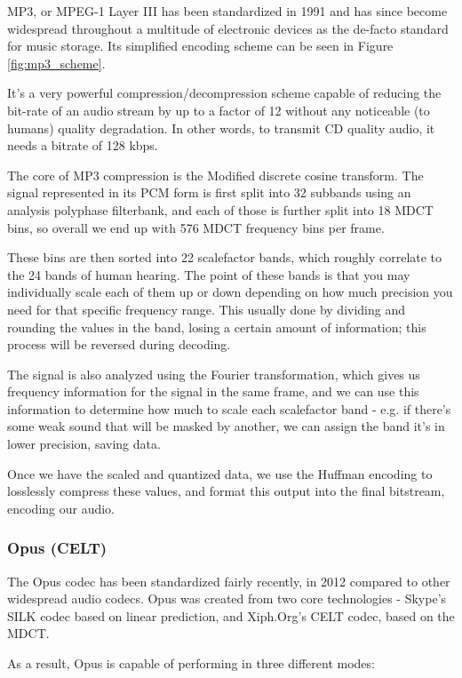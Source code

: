 MP3, or MPEG-1 Layer III has been standardized in 1991 and has since become widespread throughout a multitude of electronic devices as the de-facto standard for music storage. Its simplified encoding scheme can be seen in Figure \ref{fig:mp3_scheme}.

It's a very powerful compression/decompression scheme capable of reducing the bit-rate of an audio stream by up to a factor of 12 without any noticeable (to humans) quality degradation. In other words, to transmit CD quality audio, it needs a bitrate of 128 kbps. \cite{Raissi2002TheTB}

The core of MP3 compression is the Modified discrete cosine transform. The signal represented in its PCM form is first split into 32 subbands using an analysis polyphase filterbank, and each of those is further split into 18 MDCT bins, so overall we end up with 576 MDCT frequency bins per frame.

These bins are then sorted into 22 scalefactor bands, which roughly correlate to the 24 bands of human hearing. The point of these bands is that you may individually scale each of them up or down depending on how much precision you need for that specific frequency range. This usually done by dividing and rounding the values in the band, losing a certain amount of information; this process will be reversed during decoding.

The signal is also analyzed using the Fourier transformation, which gives us frequency information for the signal in the same frame, and we can use this information to determine how much to scale each scalefactor band - e.g. if there's some weak sound that will be masked by another, we can assign the band it's in lower precision, saving data. \cite{wilburn_2007}

Once we have the scaled and quantized data, we use the Huffman encoding to losslessly compress these values, and format this output into the final bitstream, encoding our audio.

\subsubsection{Opus (CELT)}
The Opus codec has been standardized fairly recently, in 2012 \cite{rfc6716} compared to other widespread audio codecs. Opus was created from two core technologies - Skype's SILK codec based on linear prediction, and Xiph.Org's CELT codec, based on the MDCT. \cite{opus_celt}

As a result, Opus is capable of performing in three different modes:

